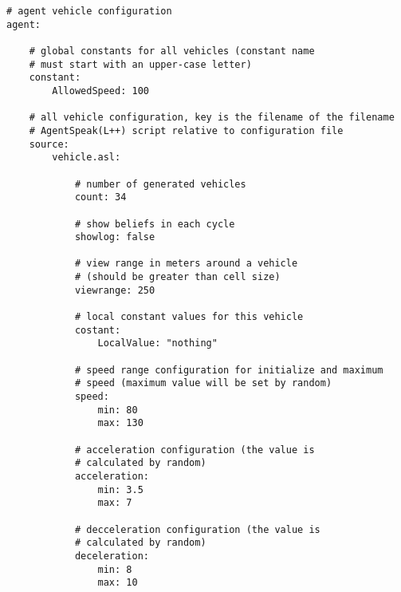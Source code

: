 \begin{lstlisting}
# agent vehicle configuration
agent:

    # global constants for all vehicles (constant name
    # must start with an upper-case letter)
    constant:
        AllowedSpeed: 100

    # all vehicle configuration, key is the filename of the filename
    # AgentSpeak(L++) script relative to configuration file
    source:
        vehicle.asl:

            # number of generated vehicles
            count: 34

            # show beliefs in each cycle
            showlog: false

            # view range in meters around a vehicle 
            # (should be greater than cell size)
            viewrange: 250

            # local constant values for this vehicle
            costant:
                LocalValue: "nothing"

            # speed range configuration for initialize and maximum
            # speed (maximum value will be set by random)
            speed:
                min: 80
                max: 130

            # acceleration configuration (the value is
            # calculated by random)
            acceleration:
                min: 3.5
                max: 7

            # decceleration configuration (the value is
            # calculated by random)
            deceleration:
                min: 8
                max: 10
\end{lstlisting}


\newpage


